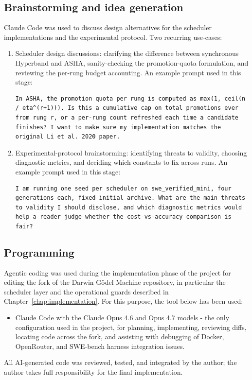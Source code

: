\subsection*{Brainstorming and idea generation}
Claude Code \cite{claude-code} was used to discuss design alternatives
for the scheduler implementations and the experimental protocol. Two
recurring use-cases:
\begin{enumerate}
    \item Scheduler design discussions: clarifying the difference
    between synchronous Hyperband and ASHA, sanity-checking the
    promotion-quota formulation, and reviewing the per-rung budget
    accounting. An example prompt used in this stage:
    \noindent\begin{minipage}{\linewidth}
    \begin{lstlisting}[style=prompt]
In ASHA, the promotion quota per rung is computed as max(1, ceil(n / eta^(r+1))). Is this a cumulative cap on total promotions ever from rung r, or a per-rung count refreshed each time a candidate finishes? I want to make sure my implementation matches the original Li et al. 2020 paper.
    \end{lstlisting}
    \end{minipage}
    \item Experimental-protocol brainstorming: identifying threats to
    validity, choosing diagnostic metrics, and deciding which
    constants to fix across runs. An example prompt used in this
    stage:
    \noindent\begin{minipage}{\linewidth}
    \begin{lstlisting}[style=prompt]
I am running one seed per scheduler on swe_verified_mini, four generations each, fixed initial archive. What are the main threats to validity I should disclose, and which diagnostic metrics would help a reader judge whether the cost-vs-accuracy comparison is fair?
    \end{lstlisting}
    \end{minipage}
\end{enumerate}

\subsection*{Programming}
Agentic coding was used during the implementation phase of the project
for editing the fork of the Darwin G\"odel Machine repository, in
particular the scheduler layer and the operational guards described in
Chapter~\ref{chap:implementation}. For this purpose, the tool below has
been used:
\begin{itemize}
    \item Claude Code \cite{claude-code} with the Claude Opus 4.6 and
    Opus 4.7 models \cite{claude-opus} - the only configuration used
    in the project, for planning, implementing, reviewing diffs,
    locating code across the fork, and assisting with debugging of
    Docker, OpenRouter, and SWE-bench harness integration issues.
\end{itemize}
All AI-generated code was reviewed, tested, and integrated by the
author; the author takes full responsibility for the final
implementation.

